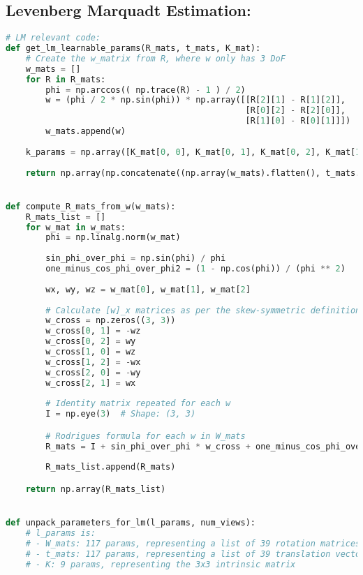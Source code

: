 \documentclass{article}
\begin{document}
\subsection{Levenberg Marquadt Estimation:}
\begin{lstlisting}[language=Python]
# LM relevant code:
def get_lm_learnable_params(R_mats, t_mats, K_mat):
    # Create the w_matrix from R, where w only has 3 DoF
    w_mats = []
    for R in R_mats:
        phi = np.arccos(( np.trace(R) - 1 ) / 2)
        w = (phi / 2 * np.sin(phi)) * np.array([[R[2][1] - R[1][2]],
                                                [R[0][2] - R[2][0]],
                                                [R[1][0] - R[0][1]]])
        w_mats.append(w)
        
    k_params = np.array([K_mat[0, 0], K_mat[0, 1], K_mat[0, 2], K_mat[1,1], K_mat[1, 2]])
    
    return np.array(np.concatenate((np.array(w_mats).flatten(), t_mats.flatten(), k_params.flatten())))


def compute_R_mats_from_w(w_mats):
    R_mats_list = []
    for w_mat in w_mats:
        phi = np.linalg.norm(w_mat)
        
        sin_phi_over_phi = np.sin(phi) / phi
        one_minus_cos_phi_over_phi2 = (1 - np.cos(phi)) / (phi ** 2)
        
        wx, wy, wz = w_mat[0], w_mat[1], w_mat[2]
        
        # Calculate [w]_x matrices as per the skew-symmetric definition
        w_cross = np.zeros((3, 3))
        w_cross[0, 1] = -wz
        w_cross[0, 2] = wy
        w_cross[1, 0] = wz
        w_cross[1, 2] = -wx
        w_cross[2, 0] = -wy
        w_cross[2, 1] = wx
        
        # Identity matrix repeated for each w
        I = np.eye(3)  # Shape: (3, 3)

        # Rodrigues formula for each w in W_mats
        R_mats = I + sin_phi_over_phi * w_cross + one_minus_cos_phi_over_phi2 * np.matmul(w_cross, w_cross)
        
        R_mats_list.append(R_mats)

    return np.array(R_mats_list)


def unpack_parameters_for_lm(l_params, num_views):
    # l_params is:
    # - W_mats: 117 params, representing a list of 39 rotation matrices (3-element vectors each)
    # - t_mats: 117 params, representing a list of 39 translation vectors (3-element vectors each)
    # - K: 9 params, representing the 3x3 intrinsic matrix


\end{lstlisting}
\end{document}
